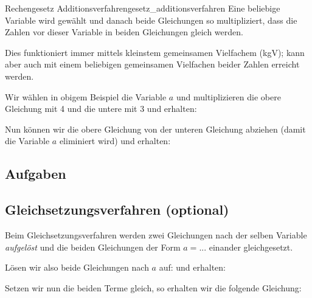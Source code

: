 
  \begin{rezept}{Rechengesetz Additionsverfahren}{gesetz_additionsverfahren}
    Eine beliebige Variable wird gewählt und danach beide Gleichungen so multipliziert,
    dass die Zahlen vor dieser Variable in beiden Gleichungen gleich werden.

    Dies funktioniert
    immer mittels kleinstem gemeinsamen Vielfachem (kgV); kann aber auch mit
    einem beliebigen gemeinsamen Vielfachen beider Zahlen erreicht werden.
  \end{rezept}

Wir wählen \zB in obigem Beispiel die Variable $a$ und multiplizieren die obere Gleichung mit 4 und die untere mit 3 und
erhalten:



  Nun können wir die obere Gleichung von der unteren Gleichung abziehen (damit die Variable $a$ eliminiert wird)
und erhalten:
\newpage


\subsection*{Aufgaben}

\newpage


\subsection{Gleichsetzungsverfahren (optional)}\label{lin_gl_gleichsetzungsverfahren}
Beim Gleichsetzungsverfahren werden zwei Gleichungen nach der selben Variable \textit{aufgelöst} und die beiden Gleichungen der Form $a = ...$ einander gleichgesetzt.

Lösen wir also beide Gleichungen nach $a$ auf:
und erhalten:



Setzen wir nun die beiden Terme gleich, so erhalten wir die
folgende Gleichung:

